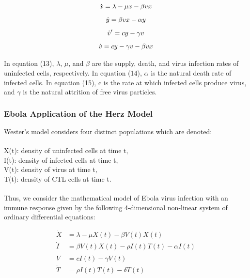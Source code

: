 \documentclass{article}
\begin{document}
\begin{equation}
		\dot x = \lambda - \mu x - \beta vx\\
\end{equation}
\begin{equation}
		\dot y = \beta vx - \alpha y\\
\end{equation}
\begin{equation}
		\dot v' = cy - \gamma v\\
\end{equation}
\begin{equation}
		\dot v = cy - \gamma v - \beta vx\\
\end{equation}

In equation (13), $\lambda$, $\mu$, and $\beta$ are the supply, death, and virus infection rates of uninfected cells, respectively.
In equation (14), $\alpha$ is the natural death rate of infected cells.
In equation (15), c is the rate at which infected cells produce virus, and $\gamma$ is the natural attrition of free virus particles.\\


\subsubsection{Ebola Application of the Herz Model}
Wester's model considers four distinct populations which are denoted:\\
\\
X(t): density of uninfected cells at time t,\\
I(t): density of infected cells at time t,\\
V(t): density of virus at time t,\\
T(t): density of CTL cells at time t.\\
\\
Thus, we consider the mathematical model of Ebola virus infection with an immune response given by the following 4-dimensional non-linear system of ordinary differential equations:

\begin{equation}
\begin{split}
	\dot X &= \lambda - \mu X(t) - \beta V(t)X(t) \\
	\dot I &= \beta V(t)X(t) - \rho I(t)T(t) - \alpha I(t) \\
	\dot V &= cI(t) - \gamma V(t) \\
	\dot T &= \rho I(t)T(t) - \delta T(t) \\
\end{split}
\end{equation}
\end{document}

